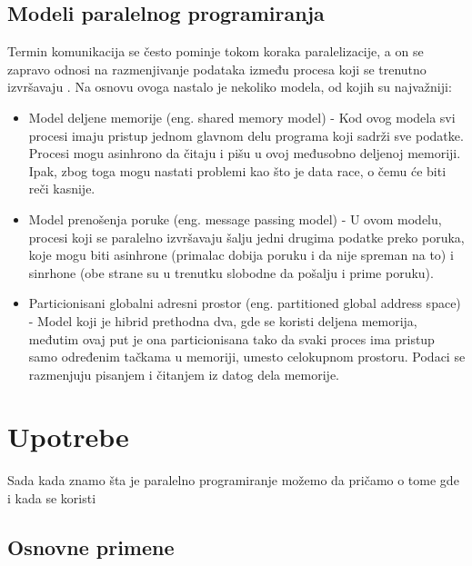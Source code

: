 \documentclass[a4paper]{article}
\begin{document}
{\subsection{Modeli paralelnog programiranja}
Termin komunikacija se često pominje tokom koraka paralelizacije, a on se zapravo odnosi na razmenjivanje podataka između procesa koji se trenutno izvršavaju \cite{models}. Na osnovu ovoga nastalo je nekoliko modela, od kojih su najvažniji: \\
\begin{itemize}
\item Model deljene memorije (eng. shared memory model) - Kod ovog modela svi procesi imaju pristup jednom glavnom delu programa koji sadrži sve podatke. Procesi mogu asinhrono da čitaju i pišu u ovoj međusobno deljenoj memoriji. Ipak, zbog toga mogu nastati problemi kao što je data race, o čemu će biti reči kasnije.
\item Model prenošenja poruke (eng. message passing model) - U ovom modelu, procesi koji se paralelno izvršavaju šalju jedni drugima podatke preko poruka, koje mogu biti asinhrone (primalac dobija poruku i da nije spreman na to) i sinrhone (obe strane su u trenutku slobodne da pošalju i prime poruku).
\item Particionisani globalni adresni prostor (eng. partitioned global address space) - Model koji je hibrid prethodna dva, gde se koristi deljena memorija, međutim ovaj put je ona particionisana tako da svaki proces ima pristup samo određenim tačkama u memoriji, umesto celokupnom prostoru. Podaci se razmenjuju pisanjem i čitanjem iz datog dela memorije.
\end{itemize}
	
	\section{Upotrebe}
Sada kada znamo šta je paralelno programiranje možemo da pričamo o tome gde i kada se koristi
\subsection{Osnovne primene}

}
\end{document}
